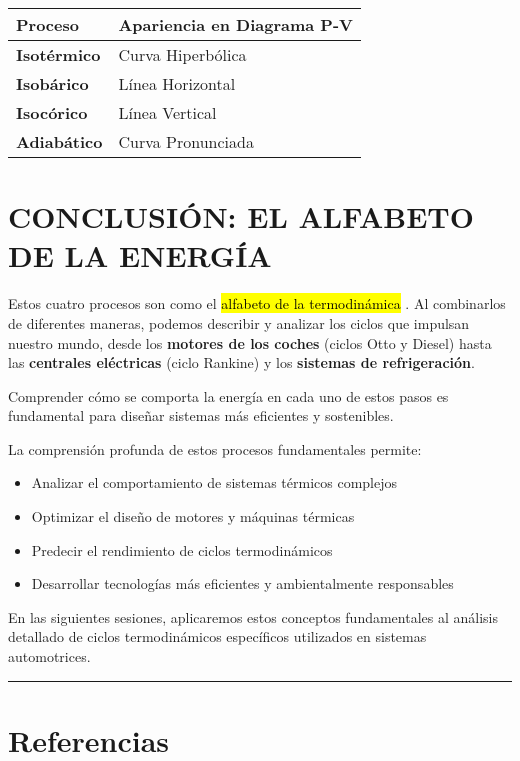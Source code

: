 \documentclass{article}
\begin{document}
\begin{center}
\begin{tabular}{|p{2.5cm}|p{4cm}|}
\hline
\textbf{Proceso} & \textbf{Apariencia en Diagrama P-V} \\
\hline\hline
\textbf{Isotérmico} & Curva Hiperbólica \\
\hline
\textbf{Isobárico} & Línea Horizontal \\
\hline
\textbf{Isocórico} & Línea Vertical \\
\hline
\textbf{Adiabático} & Curva Pronunciada \\
\hline
\end{tabular}
\end{center}

\vspace{5mm}

\section*{CONCLUSIÓN: EL ALFABETO DE LA ENERGÍA}

Estos cuatro procesos son como el \hl{alfabeto de la termodinámica} \parencite{wiki:termodinamica}. Al combinarlos de diferentes maneras, podemos describir y analizar los ciclos que impulsan nuestro mundo, desde los \textbf{motores de los coches} (ciclos Otto y Diesel) hasta las \textbf{centrales eléctricas} (ciclo Rankine) y los \textbf{sistemas de refrigeración}. 

Comprender cómo se comporta la energía en cada uno de estos pasos es fundamental para diseñar sistemas más eficientes y sostenibles.

La comprensión profunda de estos procesos fundamentales permite:

\begin{itemize}
    \item Analizar el comportamiento de sistemas térmicos complejos
    \item Optimizar el diseño de motores y máquinas térmicas
    \item Predecir el rendimiento de ciclos termodinámicos
    \item Desarrollar tecnologías más eficientes y ambientalmente responsables
\end{itemize}

En las siguientes sesiones, aplicaremos estos conceptos fundamentales al análisis detallado de ciclos termodinámicos específicos utilizados en sistemas automotrices.

\vspace{10mm}
\hrule

\section*{Referencias}
\printbibliography
\end{document}
